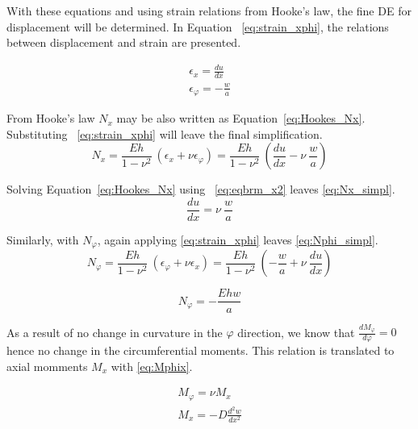 With these equations and using strain relations from Hooke's law, the fine DE for displacement will be determined. In Equation ~\ref{eq:strain_xphi}, the relations between displacement and strain are presented.

\begin{equation}
	\label{eq:strain_xphi}
	\begin{aligned}
		\epsilon_x = \frac{du}{dx}      \\
		\epsilon_\varphi = -\frac{w}{a} 
	\end{aligned}
\end{equation}

From Hooke's law $N_x$ may be also written as Equation~\ref{eq:Hookes_Nx}. Substituting ~\ref{eq:strain_xphi} will leave the final simplification.
\begin{equation}
	\label{eq:Hookes_Nx}
	N_x = \frac{Eh}{1-\nu^2}\ \left( \epsilon_x + \nu \epsilon_\varphi \right) =  \frac{Eh}{1-\nu^2}\ \left( \frac{du}{dx} -\nu \ \frac{w}{a} \right)
\end{equation} 

Solving Equation~\ref{eq:Hookes_Nx} using ~\ref{eq:eqbrm_x2} leaves \ref{eq:Nx_simpl}.
\begin{equation}
	\label{eq:Nx_simpl}
	\frac{du}{dx} =  \nu \ \frac{w}{a}
\end{equation} 

Similarly, with $N_\varphi$, again applying \ref{eq:strain_xphi} leaves \ref{eq:Nphi_simpl}.
\begin{equation}
	\label{eq:Hookes_Nphi}
	N_\varphi = \frac{Eh}{1-\nu^2}\ \left( \epsilon_\varphi + \nu \epsilon_x \right) = \frac{Eh}{1-\nu^2}\  \left( -\frac{w}{a}+\nu \ \frac{du}{dx} \right)
\end{equation} 

\begin{equation}
	\label{eq:Nphi_simpl}
	N_\varphi = - \frac{Ehw}{a}
\end{equation}

As a result of no change in curvature in the $\varphi$ direction, we know that $\frac{dM_\varphi}{d\varphi}= 0$ hence no change in the circumferential moments. This relation is translated to axial momments $M_x$ with \ref{eq:Mphix}.

\begin{equation}
	\label{eq:Mphix}
	\begin{aligned}
		M_\varphi = \nu M_x        \\
		M_x = -D \frac{d^2w}{dx^2} 
	\end{aligned}
\end{equation}

